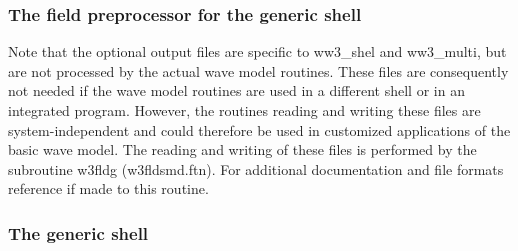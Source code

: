 


\pb
\vsssub
\subsubsection{The field preprocessor for the generic shell}
\label{sec:prep}
\vsssub



\vspace{\baselineskip} 
\noindent 
Note that the optional output files are specific to {\file ww3\_shel} and
{\file ww3\_multi}, but are not processed by the actual wave model
routines. These files are consequently not needed if the wave model routines
are used in a different shell or in an integrated program. However, the
routines reading and writing these files are system-independent and could
therefore be used in customized applications of the basic wave model. The
reading and writing of these files is performed by the subroutine {\F w3fldg}
({\file w3fldsmd.ftn}). For additional documentation and file formats
reference if made to this routine.


\pb
\vsssub
\subsubsection{The generic shell} \label{sec:shell}
\vsssub

